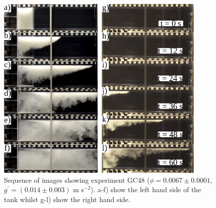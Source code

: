 \documentclass[authoryear,preprint,review,12pt]{elsarticle}
\begin{document}
\begin{figure}[ht!]
  \centerline{\includegraphics[width=0.9\textwidth]{GC48.png}}
  \caption{Sequence of images showing experiment GC48 ($\phi = 0.0067 \pm 0.0001$, $g^{\prime} = (0.014 \pm 0.003)$ m s$^{-2}$). a-f) show the left hand side of the tank whilst g-l) show the right hand side.}
  \label{fig:GC48}
\end{figure}
\end{document}
